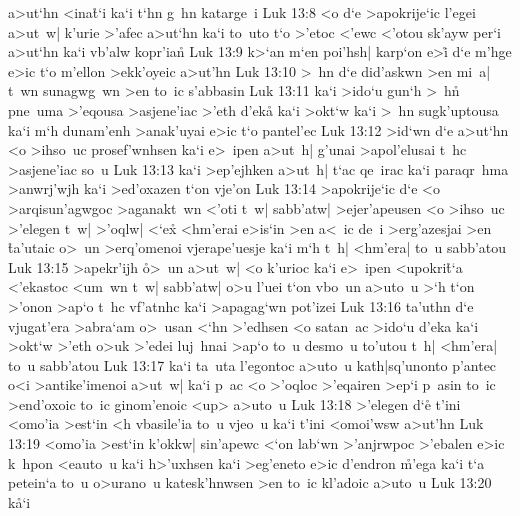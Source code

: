 a>ut`hn
<ina\r{t}`i
ka`i
t`hn
g~hn
katarge~i\bibvsend
\vs Luk 13:8
<o
d`e
>apokrije`ic
l'egei
a>ut~w|
k'urie
>'afec
a>ut`hn
ka`i
to~uto
t`o
>'etoc
<'ewc
<'otou
sk'ayw
per`i
a>ut`hn
ka`i
vb'alw
kopr'ia\r{n}\bibvsend
{}
\vs Luk 13:9
k>`an
m`en
poi'hsh|
karp`on
e>i\r{}
d`e
m'hge
e>ic
t`o
m'ellon
>ekk'oyeic
a>ut'hn\bibvsend
\vs Luk 13:10
>~hn
d`e
did'askwn
>en
mi~a|
t~wn
sunagwg~wn
>en
to~ic
s'abbasin\bibvsend
\vs Luk 13:11
ka`i
>ido`u
gun`h
>~h\r{n}
pne~uma
>'eqousa
>asjene'iac
>'eth
d'eka\r{}
ka`i
>okt`w
ka`i
>~hn
sugk'uptousa
ka`i
m`h
dunam'enh
>anak'uyai
e>ic
t`o
pantel'ec\bibvsend
\vs Luk 13:12
>id`wn
d`e
a>ut`hn
<o
>ihso~uc
prosef'wnhsen
ka`i
e>~ipen
a>ut~h|
g'unai
>apol'elusai
t~hc
>asjene'iac
so~u\bibvsend
\vs Luk 13:13
ka`i
>ep'ejhken
a>ut~h|
t`ac
qe~irac
ka`i
paraqr~hma
>anwrj'wjh
ka`i
>ed'oxazen
t`on
vje'on\bibvsend
\vs Luk 13:14
>apokrije`ic
d`e
<o
>arqisun'agwgoc
>aganakt~wn
<'oti
t~w|
sabb'atw|
>ejer'apeusen
<o
>ihso~uc
>'elegen
t~w|
>'oqlw|
<`e\r{x}
<hm'erai
e>is`in
>en
a<~ic
de~i
>erg'azesjai
>en
\r{t}a'utaic
o>~un
>erq'omenoi
vjerape'uesje
ka`i
m`h
t~h|
<hm'era|
to~u
sabb'atou\bibvsend
\vs Luk 13:15
>apekr'ijh
\r{o}>~un
a>ut~w|
<o
k'urioc
ka`i
e>~ipen
<upokri\r{t}`a
<'ekastoc
<um~wn
t~w|
sabb'atw|
o>u
l'uei
t`on
vbo~un
a>uto~u
>`h
t`on
>'onon
>ap`o
t~hc
vf'atnhc
ka`i
>apagag`wn
pot'izei\bibvsend
\vs Luk 13:16
ta'uthn
d`e
vjugat'era
>abra`am
o>~usan
<`hn
>'edhsen
<o
satan~ac
>ido`u
d'eka
ka`i
>okt`w
>'eth
o>uk
>'edei
luj~hnai
>ap`o
to~u
desmo~u
to'utou
t~h|
<hm'era|
to~u
sabb'atou\bibvsend
\vs Luk 13:17
ka`i
ta~uta
l'egontoc
a>uto~u
kath|sq'unonto
p'antec
o<i
>antike'imenoi
a>ut~w|
ka`i
p~ac
<o
>'oqloc
>'eqairen
>ep`i
p~asin
to~ic
>end'oxoic
to~ic
ginom'enoic
<up>
a>uto~u\bibvsend
\vs Luk 13:18
>'elegen
d`e\r{}
t'ini
<omo'ia
>est`in
<h
vbasile'ia
to~u
vjeo~u
ka`i
t'ini
<omoi'wsw
a>ut'hn\bibvsend
\vs Luk 13:19
<omo'ia
>est`in
k'okkw|
sin'apewc
<`on
lab`wn
>'anjrwpoc
>'ebalen
e>ic
k~hpon
<eauto~u
ka`i
h>'uxhsen
ka`i
>eg'eneto
e>ic
d'endron
\r{m}'ega
ka`i
t`a
petein`a
to~u
o>urano~u
katesk'hnwsen
>en
to~ic
kl'adoic
a>uto~u\bibvsend
\vs Luk 13:20
k\r{a}`i
